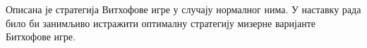 \documentclass[a4paper]{article}
\begin{document}
Описана је стратегија Витхофове игре у случају нормалног нима. У наставку рада било би занимљиво истражити оптималну стратегију мизерне варијанте Битхофове игре.

%
\newpage
{}
\appendix
 

\end{document}
